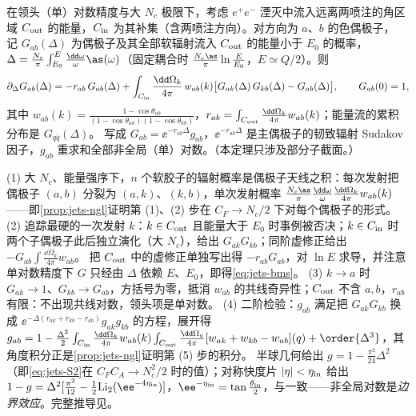 \begin{theorem}\label{thm:jets-bms}
在领头（单）对数精度与大 $N_c$ 极限下，考虑 $e^+e^-$ 湮灭中流入远离两喷注的角区域 $C_{\rm out}$ 的能量，$C_{\rm in}$ 为其补集（含两喷注方向）。对方向为 $a$、$b$ 的色偶极子，
记 $G_{ab}(\Delta)$ 为偶极子及其全部软辐射流入 $C_{\rm out}$ 的能量小于 $E_0$ 的概率，$\Delta=\frac{N_c}{\pi}\int_{E_0}^{E}\frac{\dd\omega}{\omega}\as(\omega)$（固定耦合时 $\frac{N_c\as}{\pi}\ln\frac{E}{E_0}$，$E\simeq Q/2$）。则
\begin{equation}\label{eq:jets-bms}
\partial_\Delta G_{ab}(\Delta)=-r_{ab}\,G_{ab}(\Delta)+\int_{C_{\rm in}}\frac{\dd\Omega_k}{4\pi}\,w_{ab}(k)\big[G_{ak}(\Delta)\,G_{kb}(\Delta)-G_{ab}(\Delta)\big],\qquad G_{ab}(0)=1,
\end{equation}
其中 $w_{ab}(k)=\frac{1-\cos\theta_{ab}}{(1-\cos\theta_{ak})(1-\cos\theta_{kb})}$，$r_{ab}=\int_{C_{\rm out}}\frac{\dd\Omega_k}{4\pi}w_{ab}(k)$；能量流的累积分布是 $G_{q\bar q}(\Delta)$。
写成 $G_{ab}=\ee^{-r_{ab}\Delta}g_{ab}$，$\ee^{-r_{ab}\Delta}$ 是主偶极子的韧致辐射 Sudakov 因子，$g_{ab}$ 重求和全部非全局（单）对数。（本定理只涉及部分子截面。）
\end{theorem}

\begin{proofsketch}
(1) 大 $N_c$、能量强序下，$n$ 个软胶子的辐射概率是偶极子天线之积\cite[式~(3.3)、(3.4)]{Banfi:2002hw}：每次发射把偶极子 $(a,b)$ 分裂为 $(a,k)$、$(k,b)$，单次发射概率 $\frac{N_c\as}{\pi}\frac{\dd\omega}{\omega}\frac{\dd\Omega_k}{4\pi}w_{ab}(k)$——即\cref{prop:jets-ngl}证明第 (1)、(2) 步在 $C_F\to N_c/2$ 下对每个偶极子的形式。
(2) 追踪最硬的一次发射 $k$：$k\in C_{\rm out}$ 且能量大于 $E_0$ 时事例被否决；$k\in C_{\rm in}$ 时两个子偶极子此后独立演化（大 $N_c$），给出 $G_{ak}G_{kb}$；同阶虚修正给出 $-G_{ab}\int\frac{\dd\Omega_k}{4\pi}w_{ab}$。
把 $C_{\rm out}$ 中的虚修正单独写出得 $-r_{ab}G_{ab}$，对 $\ln E$ 求导，并注意单对数精度下 $G$ 只经由 $\Delta$ 依赖 $E$、$E_0$，即得\cref{eq:jets-bms}。
(3) $k\to a$ 时 $G_{ak}\to1$、$G_{kb}\to G_{ab}$，方括号为零，抵消 $w_{ab}$ 的共线奇异性；$C_{\rm out}$ 不含 $a,b$，$r_{ab}$ 有限：不出现共线对数，领头项是单对数。
(4) 二阶检验：$g_{ab}$ 满足把 $G_{ak}G_{kb}$ 换成 $\ee^{-\Delta(r_{ak}+r_{kb}-r_{ab})}g_{ak}g_{kb}$ 的方程，展开得
$g_{ab}=1-\frac{\Delta^2}{2}\int_{C_{\rm in}}\frac{\dd\Omega_k}{4\pi}w_{ab}(k)\int_{C_{\rm out}}\frac{\dd\Omega_q}{4\pi}[w_{ak}+w_{kb}-w_{ab}](q)+\order{\Delta^3}$，其角度积分正是\cref{prop:jets-ngl}证明第 (5) 步的积分。
半球几何给出 $g=1-\frac{\pi^2}{24}\Delta^2$（即\cref{eq:jets-S2}在 $C_FC_A\to N_c^2/2$ 时的值）；对称快度片 $|\eta|<\eta_{\rm in}$ 给出
$1-g=\Delta^2[\frac{\pi^2}{12}-\frac12\mathrm{Li}_2(\ee^{-4\eta_{\rm in}})]$，$\ee^{-\eta_{\rm in}}=\tan\frac{\theta_{\rm in}}{2}$，与\cite[式~(5.5)]{Banfi:2002hw}一致——非全局对数是\emph{边界效应}。完整推导见\cite[第~4~节]{Banfi:2002hw}。
\end{proofsketch}

